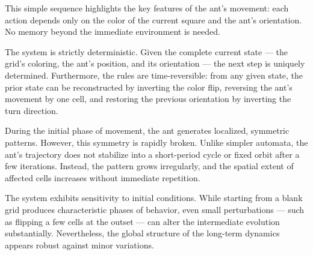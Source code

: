 This simple sequence highlights the key features of the ant’s movement: each action depends only on the color of the current square and the ant’s orientation. No memory beyond the immediate environment is needed.

The system is strictly deterministic. Given the complete current state — the grid’s coloring, the ant’s position, and its orientation — the next step is uniquely determined. Furthermore, the rules are time-reversible: from any given state, the prior state can be reconstructed by inverting the color flip, reversing the ant’s movement by one cell, and restoring the previous orientation by inverting the turn direction.

During the initial phase of movement, the ant generates localized, symmetric patterns. However, this symmetry is rapidly broken. Unlike simpler automata, the ant’s trajectory does not stabilize into a short-period cycle or fixed orbit after a few iterations. Instead, the pattern grows irregularly, and the spatial extent of affected cells increases without immediate repetition.

The system exhibits sensitivity to initial conditions. While starting from a blank grid produces characteristic phases of behavior, even small perturbations — such as flipping a few cells at the outset — can alter the intermediate evolution substantially. Nevertheless, the global structure of the long-term dynamics appears robust against minor variations.

